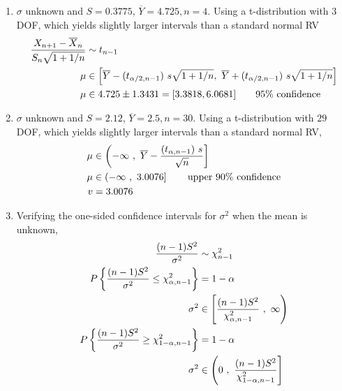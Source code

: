 \begin{enumerate}
	\item $ \sigma $ unknown and $ S = 0.3775 $, $ \overline{Y} = 4.725, n = 4$. Using a t-distribution with $ 3 $ DOF, which yields slightly larger intervals than a standard normal RV\\
	\begin{subequations}
		\begin{align}
			\frac{X_{n+1} - \overline{X}_n}{S_n \sqrt{1 + 1/n}} &\sim t_{n-1} \nonumber \\
			\mu &\in \left[ \overline{Y} - (t_{\alpha/2, n-1})\ s \sqrt{1 + 1/n}, \ \overline{Y} + (t_{\alpha/2, n-1})\ s \sqrt{1 + 1/n} \right] \nonumber \\
			\mu &\in 4.725 \pm 1.3431 = [3.3818, 6.0681] \qquad \text{95\% confidence} 
		\end{align}\\
	\end{subequations}
	
	\item  $ \sigma $ unknown and $ S = 2.12 $, $ \overline{Y} = 2.5, n = 30$. Using a t-distribution with $ 29 $ DOF, which yields slightly larger intervals than a standard normal RV,\\
	\begin{subequations}
		\begin{align}
			\mu &\in \left(-\infty\ ,\  \overline{Y} - \frac{(t_{\alpha, n-1})\ s}{\sqrt{n}} \right] \nonumber \\
			\mu &\in \left(-\infty\ ,\ 3.0076  \right] \qquad \text{upper 90\% confidence} \nonumber \\
			v &= 3.0076
		\end{align}\\
	\end{subequations}
	
	\item  Verifying the one-sided confidence intervals for $ \sigma^2 $ when the mean is unknown,\\
	\begin{subequations}
		\begin{align}
			\frac{(n-1)S^2}{\sigma^2} &\sim \chi^2_{n-1} \nonumber \\
			P \left\{ \frac{(n-1)S^2}{\sigma^2} \leq \chi^2_{\alpha, n-1} \right\} &= 1 - \alpha \nonumber \\
			\sigma^2 &\in \left[ \frac{(n-1)S^2}{\chi^2_{\alpha, n-1}}\ ,\ \infty \right) \\
			P \left\{ \frac{(n-1)S^2}{\sigma^2} \geq \chi^2_{1 - \alpha, n-1} \right\} &= 1 - \alpha \nonumber \\
			\sigma^2 &\in \left(0\ ,\ \frac{(n-1)S^2}{\chi^2_{1-\alpha, n-1}} \right]
		\end{align}\\
	\end{subequations}


\end{enumerate}
